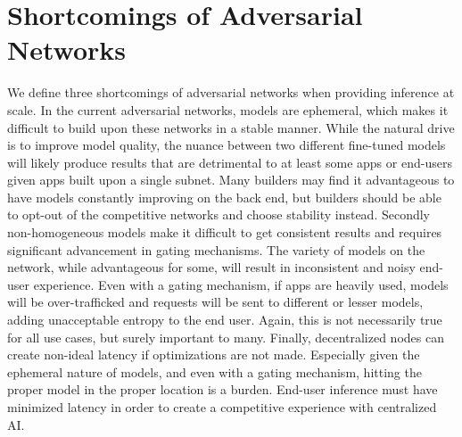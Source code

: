 \documentclass[12pt]{article}
\begin{document}
\section{Shortcomings of Adversarial Networks}
We define three shortcomings of adversarial networks when providing inference at scale. 
In the current adversarial networks, models are ephemeral, which makes it difficult to build upon these networks in a stable manner. While the natural drive is to improve model quality, the nuance between two different fine-tuned models will likely produce results that are detrimental to at least some apps or end-users given apps built upon a single subnet. Many builders may find it advantageous to have models constantly improving on the back end, but builders should be able to opt-out of the competitive networks and choose stability instead.
Secondly non-homogeneous models make it difficult to get consistent results and requires significant advancement in gating mechanisms. The variety of models on the network, while advantageous for some, will result in inconsistent and noisy end-user experience. Even with a gating mechanism, if apps are heavily used, models will be over-trafficked and requests will be sent to different or lesser models, adding unacceptable entropy to the end user. Again, this is not necessarily true for all use cases, but surely important to many. 
Finally, decentralized nodes can create non-ideal latency if optimizations are not made. Especially given the ephemeral nature of models, and even with a gating mechanism, hitting the proper model in the proper location is a burden. End-user inference must have minimized latency in order to create a competitive experience with centralized AI. 
\end{document}

